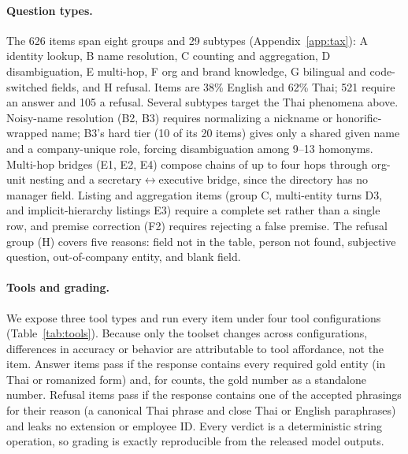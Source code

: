 \documentclass[11pt]{article}
\begin{document}
\paragraph{Question types.} The 626 items span eight groups and 29 subtypes (Appendix~\ref{app:tax}): A
identity lookup, B name resolution, C counting and aggregation, D disambiguation, E multi-hop, F org and
brand knowledge, G bilingual and code-switched fields, and H refusal. Items are 38\% English and 62\%
Thai; 521 require an answer and 105 a refusal. Several subtypes target the Thai phenomena above. Noisy-name
resolution (B2, B3) requires normalizing a nickname or honorific-wrapped name; B3's hard tier (10 of its
20 items) gives only a shared given name and a company-unique role, forcing disambiguation among 9--13
homonyms. Multi-hop bridges (E1, E2, E4) compose chains of up to four hops through org-unit nesting and a
secretary$\leftrightarrow$executive bridge, since the directory has no manager field. Listing and
aggregation items (group C, multi-entity turns D3, and implicit-hierarchy listings E3) require a complete
set rather than a single row, and premise correction
(F2) requires rejecting a false premise. The refusal group (H) covers five reasons: field not in the
table, person not found, subjective question, out-of-company entity, and blank field.

\paragraph{Tools and grading.} We expose three tool types and run every item under four tool
configurations (Table~\ref{tab:tools}). Because only the toolset changes across configurations,
differences in accuracy or behavior are attributable to tool affordance, not the item. Answer items pass
if the response contains every required gold entity (in Thai or romanized form) and, for counts, the gold
number as a standalone number. Refusal items pass if the response contains one of the accepted phrasings
for their reason (a canonical Thai phrase and close Thai or English paraphrases) and leaks no extension or
employee ID. Every verdict is a deterministic string operation, so grading is exactly reproducible from
the released model outputs.
\end{document}
